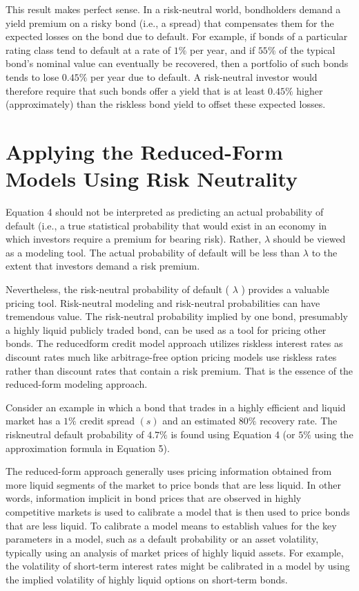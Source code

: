\documentclass[11pt]{article}
\begin{document}
This result makes perfect sense. In a risk-neutral world, bondholders demand a yield premium on a risky bond (i.e., a spread) that compensates them for the expected losses on the bond due to default. For example, if bonds of a particular rating class tend to default at a rate of $1 \%$ per year, and if $55 \%$ of the typical bond's nominal value can eventually be recovered, then a portfolio of such bonds tends to lose $0.45 \%$ per year due to default. A risk-neutral investor would therefore require that such bonds offer a yield that is at least $0.45 \%$ higher (approximately) than the riskless bond yield to offset these expected losses.

\section*{Applying the Reduced-Form Models Using Risk Neutrality}
Equation 4 should not be interpreted as predicting an actual probability of default (i.e., a true statistical probability that would exist in an economy in which investors require a premium for bearing risk). Rather, $\lambda$ should be viewed as a modeling tool. The actual probability of default will be less than $\lambda$ to the extent that investors demand a risk premium.

Nevertheless, the risk-neutral probability of default ( $\lambda$ ) provides a valuable pricing tool. Risk-neutral modeling and risk-neutral probabilities can have tremendous value. The risk-neutral probability implied by one bond, presumably a highly liquid publicly traded bond, can be used as a tool for pricing other bonds. The reducedform credit model approach utilizes riskless interest rates as discount rates much like arbitrage-free option pricing models use riskless rates rather than discount rates that contain a risk premium. That is the essence of the reduced-form modeling approach.

Consider an example in which a bond that trades in a highly efficient and liquid market has a $1 \%$ credit spread $(s)$ and an estimated $80 \%$ recovery rate. The riskneutral default probability of $4.7 \%$ is found using Equation 4 (or $5 \%$ using the approximation formula in Equation 5).

The reduced-form approach generally uses pricing information obtained from more liquid segments of the market to price bonds that are less liquid. In other words, information implicit in bond prices that are observed in highly competitive markets is used to calibrate a model that is then used to price bonds that are less liquid. To calibrate a model means to establish values for the key parameters in a model, such as a default probability or an asset volatility, typically using an analysis of market prices of highly liquid assets. For example, the volatility of short-term interest rates might be calibrated in a model by using the implied volatility of highly liquid options on short-term bonds.
\end{document}
